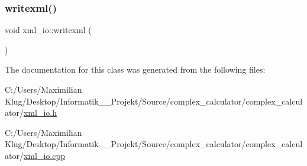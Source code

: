 \subsubsection{\texorpdfstring{writexml()}{writexml()}}
{\footnotesize\ttfamily void xml\+\_\+io\+::writexml (\begin{DoxyParamCaption}{ }\end{DoxyParamCaption})}



The documentation for this class was generated from the following files\+:\begin{DoxyCompactItemize}
\item 
C\+:/\+Users/\+Maximilian Klug/\+Desktop/\+Informatik\+\_\+\_\+\+Projekt/\+Source/complex\+\_\+calculator/complex\+\_\+calculator/\mbox{\hyperlink{xml__io_8h}{xml\+\_\+io.\+h}}\item 
C\+:/\+Users/\+Maximilian Klug/\+Desktop/\+Informatik\+\_\+\_\+\+Projekt/\+Source/complex\+\_\+calculator/complex\+\_\+calculator/\mbox{\hyperlink{xml__io_8cpp}{xml\+\_\+io.\+cpp}}\end{DoxyCompactItemize}
